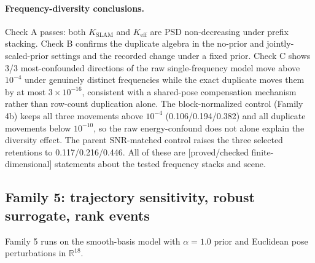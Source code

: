 \documentclass[12pt]{article}
\newcommand{\FDL}{\textnormal{[proved/checked finite-dimensional]}}
\begin{document}
\paragraph{Frequency-diversity conclusions.}
Check A passes: both $K_{\mathrm{SLAM}}$ and $K_{\mathrm{eff}}$ are PSD
non-decreasing under prefix stacking. Check B confirms the duplicate algebra
in the no-prior and jointly-scaled-prior settings and the recorded change under
a fixed prior. Check C shows 3/3 most-confounded directions of the raw
single-frequency model move above $10^{-4}$ under genuinely distinct
frequencies while the exact duplicate moves them by at most $3\times10^{-16}$,
consistent with a shared-pose compensation mechanism rather than
row-count duplication alone. The block-normalized control (Family 4b) keeps
all three movements above $10^{-4}$ (0.106/0.194/0.382) and all duplicate
movements below $10^{-10}$, so the raw energy-confound does not alone explain
the diversity effect. The parent SNR-matched control raises the three selected
retentions to 0.117/0.216/0.446. All of these are \FDL{} statements about the
tested frequency stacks and scene.

\subsection{Family 5: trajectory sensitivity, robust surrogate, rank events}\label{sec:family5}

Family 5 runs on the smooth-basis model with $\alpha=1.0$ prior and Euclidean
pose perturbations in $\mathbb{R}^{18}$.
\end{document}
